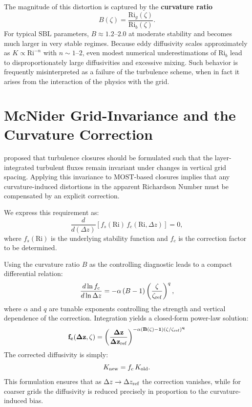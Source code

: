 \documentclass[12pt, a4paper]{article}
\begin{document}
The magnitude of this distortion is captured by the \textbf{curvature ratio}
$$ B(\zeta)=\frac{\text{Ri}_g(\zeta)}{\text{Ri}_b(\zeta)}. $$
For typical $\text{SBL}$ parameters, $B\approx 1.2–2.0$ at moderate stability and becomes much larger in very stable regimes. Because eddy diffusivity scales approximately as $K\propto \text{Ri}^{-n}$ with $n\sim 1–2$, even modest numerical underestimations of $\text{Ri}_b$ lead to disproportionately large diffusivities and excessive mixing. Such behavior is frequently misinterpreted as a failure of the turbulence scheme, when in fact it arises from the interaction of the physics with the grid.

\section{McNider Grid-Invariance and the Curvature Correction}

\cite{mcnider1995} proposed that turbulence closures should be formulated such that the layer-integrated turbulent fluxes remain invariant under changes in vertical grid spacing. Applying this invariance to $\text{MOST}$-based closures implies that any curvature-induced distortions in the apparent $\text{Richardson Number}$ must be compensated by an explicit correction.

We express this requirement as:
$$ \frac{d}{d(\Delta z)}
\left[
f_s(\text{Ri})\, f_c(\text{Ri},\Delta z)
\right] = 0, $$
where $f_s(\text{Ri})$ is the underlying stability function and $f_c$ is the correction factor to be determined.

Using the curvature ratio $B$ as the controlling diagnostic leads to a compact differential relation:
$$ \frac{d\ln f_c}{d \ln \Delta z}
=
-\alpha\,(B-1)
\left(\frac{\zeta}{\zeta_{\rm ref}}\right)^q, $$
where $\alpha$ and $q$ are tunable exponents controlling the strength and vertical dependence of the correction. Integration yields a closed-form power-law solution:
$$ \mathbf{f_c(\Delta z,\zeta)
=
\left(
\frac{\Delta z}{\Delta z_{\rm ref}}
\right)^{-\alpha(B(\zeta)-1)(\zeta/\zeta_{\rm ref})^q}} $$
The corrected diffusivity is simply:
$$ K_{\rm new} = f_c\,K_{\rm old}. $$
This formulation ensures that as $\Delta z\to\Delta z_{\rm ref}$ the correction vanishes, while for coarser grids the diffusivity is reduced precisely in proportion to the curvature-induced bias.

\end{document}
